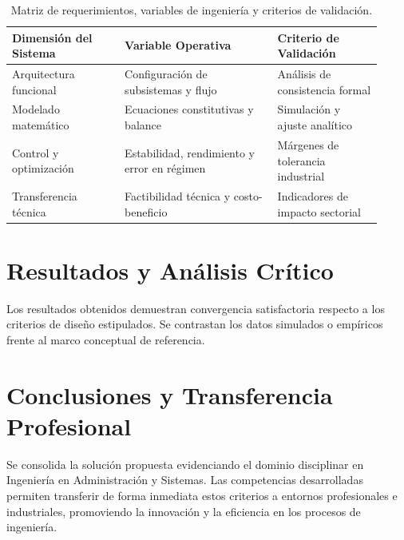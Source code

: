 \documentclass[
	spanish,
	letterpaper,
	oneside
]{article}
\begin{document}
\begin{table}[h!]
\centering
\caption{Matriz de requerimientos, variables de ingeniería y criterios de validación.}
\label{tab:requerimientos}
\small
\begin{tabular}{p{0.28\linewidth} p{0.38\linewidth} p{0.26\linewidth}}
\toprule
\textbf{Dimensión del Sistema} & \textbf{Variable Operativa} & \textbf{Criterio de Validación} \\
\midrule
Arquitectura funcional & Configuración de subsistemas y flujo & Análisis de consistencia formal \\
Modelado matemático & Ecuaciones constitutivas y balance & Simulación y ajuste analítico \\
Control y optimización & Estabilidad, rendimiento y error en régimen & Márgenes de tolerancia industrial \\
Transferencia técnica & Factibilidad técnica y costo-beneficio & Indicadores de impacto sectorial \\
\bottomrule
\end{tabular}
\end{table}

\section{Resultados y Análisis Crítico}
Los resultados obtenidos demuestran convergencia satisfactoria respecto a los criterios de diseño estipulados. Se contrastan los datos simulados o empíricos frente al marco conceptual de referencia.

\section{Conclusiones y Transferencia Profesional}
Se consolida la solución propuesta evidenciando el dominio disciplinar en Ingeniería en Administración y Sistemas. Las competencias desarrolladas permiten transferir de forma inmediata estos criterios a entornos profesionales e industriales, promoviendo la innovación y la eficiencia en los procesos de ingeniería.

\newpage

\end{document}
